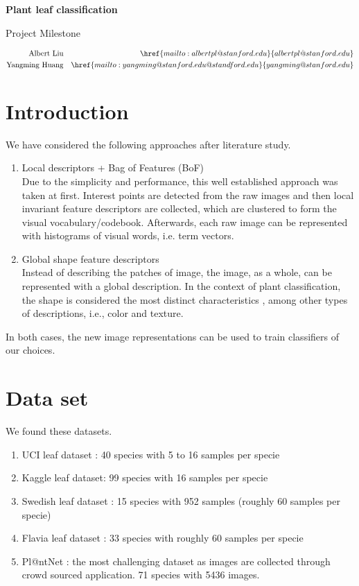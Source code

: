 \documentclass{article}
\begin{document}
\hrulefill \par
{\Large \textbf{Plant leaf classification}\par}
{\Large Project Milestone\par}
\hrulefill \par
\begin{align*}
\mathrm{Albert\ Liu}
  &&\href{mailto:albertpl@stanford.edu}{albertpl@stanford.edu}\\
\mathrm{Yangming\ Huang}
  &&\href{mailto:yangming@stanford.edu@standford.edu}{yangming@stanford.edu}\\
\end{align*}

\section{ Introduction } 
We have considered the following approaches after literature study.
\begin{enumerate}
  \item Local descriptors + Bag of Features (BoF)\\
   Due to the simplicity and performance, this well established approach was taken at first. Interest points are detected from the raw images and then local invariant feature descriptors are collected, which are clustered to form the visual vocabulary/codebook. Afterwards, each raw image can be represented with histograms of visual words, i.e. term vectors. 
 \item Global shape feature descriptors\\
   Instead of describing the patches of image, the image, as a whole, can be represented with a global description. In the context of plant classification, the shape is considered the most distinct characteristics \cite{Itheri}, among other types of descriptions, i.e., color and texture.
\end{enumerate}
In both cases, the new image representations can be used to train classifiers of our choices.


\section{Data set}
We found these datasets.
\begin{enumerate}
  \item UCI leaf dataset \cite{UCIDataSet}: 40 species with 5 to 16 samples per specie
  \item Kaggle leaf dataset\cite{Pedro13}: 99 species with 16 samples per specie
  \item Swedish leaf dataset \cite{SwedishLeafDataset}: 15 species with 952 samples (roughly 60 samples per specie)
  \item Flavia leaf dataset \cite{FlaviaDataset}: 33 species with roughly 60 samples per specie
  \item Pl@ntNet \cite{PlanetNet}: the most challenging dataset as images are collected through crowd sourced application. 71 species with 5436 images.

\end{enumerate}
\end{document}
